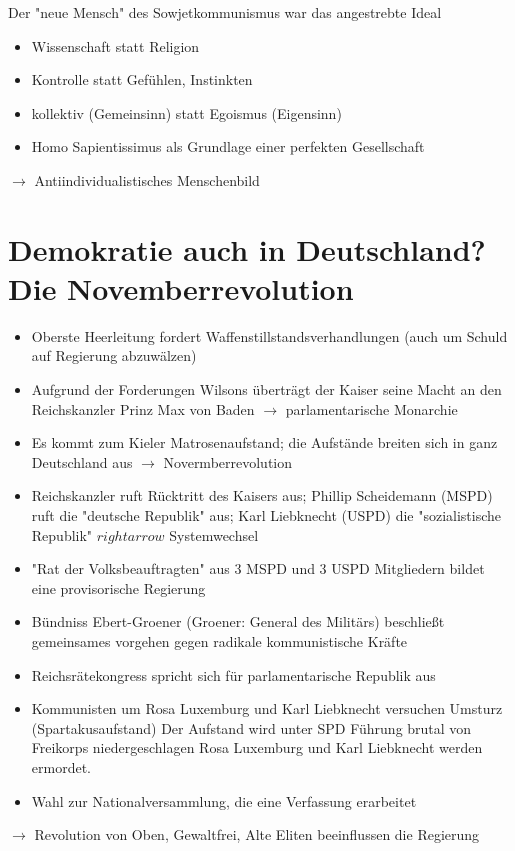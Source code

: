 \documentclass{article}
\begin{document}
Der "neue Mensch" des Sowjetkommunismus war das angestrebte Ideal
\begin{itemize}
    \item Wissenschaft statt Religion
    \item Kontrolle statt Gefühlen, Instinkten
    \item kollektiv (Gemeinsinn) statt Egoismus (Eigensinn)
    \item Homo Sapientissimus als Grundlage einer perfekten Gesellschaft
\end{itemize}
$\rightarrow$ Antiindividualistisches Menschenbild

\section*{ Demokratie auch in Deutschland? Die Novemberrevolution}
\begin{itemize}
    \item Oberste Heerleitung fordert Waffenstillstandsverhandlungen (auch um Schuld auf Regierung abzuwälzen)
    \item Aufgrund der Forderungen Wilsons überträgt der Kaiser
    seine Macht an den Reichskanzler Prinz Max von Baden $\rightarrow$ parlamentarische Monarchie
    \item Es kommt zum Kieler Matrosenaufstand; die Aufstände breiten
    sich in ganz Deutschland aus $\rightarrow$ Novermberrevolution
    \item Reichskanzler ruft Rücktritt des Kaisers aus;
    Phillip Scheidemann (MSPD) ruft die "deutsche Republik" aus;
    Karl Liebknecht (USPD) die "sozialistische Republik" $rightarrow$ Systemwechsel
    \item "Rat der Volksbeauftragten" aus 3 MSPD und 3 USPD
    Mitgliedern bildet eine provisorische Regierung
    \item Bündniss Ebert-Groener (Groener: General des Militärs) beschließt
    gemeinsames vorgehen gegen radikale kommunistische Kräfte
    \item Reichsrätekongress spricht sich für parlamentarische Republik aus
    \item Kommunisten um Rosa Luxemburg und Karl Liebknecht versuchen Umsturz (Spartakusaufstand)
    Der Aufstand wird unter SPD Führung brutal von Freikorps niedergeschlagen
    Rosa Luxemburg und Karl Liebknecht werden ermordet.
    \item Wahl zur Nationalversammlung, die eine Verfassung erarbeitet
\end{itemize}
$\rightarrow$ Revolution von Oben, Gewaltfrei, Alte Eliten beeinflussen die Regierung
\end{document}

